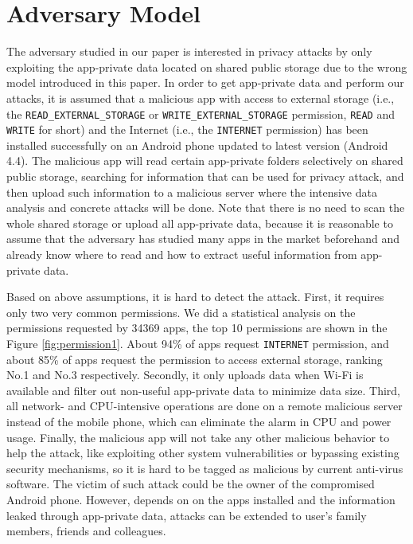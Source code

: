 \documentclass{sig-alternate}
\begin{document}
\begin{figure}[htb]
\end{figure}



\section{Adversary Model}
\label{adversarymodel}



The adversary studied in our paper is interested in privacy attacks by only exploiting the app-private data located on shared public storage due to the wrong model introduced in this paper. In order to get app-private data and perform our attacks, it is assumed that a malicious app with access to external storage (i.e., the \texttt{READ\_EXTERNAL\_STORAGE} or \texttt{WRITE\_EXTERNAL\_STORAGE} permission, \texttt{READ} and \texttt{WRITE} for short) and the Internet (i.e., the \texttt{INTERNET} permission) has been installed successfully on an Android phone updated to latest version (Android 4.4). The malicious app will read certain app-private folders selectively on shared public storage, searching for information that can be used for privacy attack, and then upload such information to a malicious server where the intensive data analysis and concrete attacks will be done. Note that there is no need to scan the whole shared storage or upload all app-private data, because it is reasonable to assume that the adversary has studied many apps in the market beforehand and already know where to read and how to extract useful information from app-private data.

Based on above assumptions, it is hard to detect the attack. First, it requires only two very common permissions. We did a statistical analysis on the permissions requested by 34369 apps, the top 10 permissions are shown in the Figure \ref{fig:permission1}. About 94\% of apps request \texttt{INTERNET} permission, and about 85\% of apps request the permission to access external storage, ranking No.1 and No.3 respectively. Secondly, it only uploads data when Wi-Fi is available and filter out non-useful app-private data to minimize data size. Third, all network- and CPU-intensive operations are done on a remote malicious server instead of the mobile phone, which can eliminate the alarm in CPU and power usage. Finally, the malicious app will not take any other malicious behavior to help the attack, like exploiting other system vulnerabilities or bypassing existing security mechanisms, so it is hard to be tagged as malicious by current anti-virus software. The victim of such attack could be the owner of the compromised Android phone. However, depends on on the apps installed and the information leaked through app-private data, attacks can be extended to user's family members, friends and colleagues.
\end{document}
